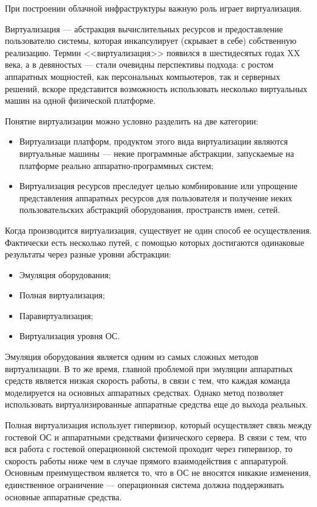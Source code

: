 При построении облачной инфраструктуры важную роль играет виртуализация.

Виртуализация --- абстракция вычислительных ресурсов и предоставление пользователю системы, которая инкапсулирует (скрывает в себе) собственную реализацию.
Термин <<виртуализация>> появился в шестидесятых годах XX века, а в девяностых --- стали очевидны перспективы подхода: с ростом аппаратных мощностей, как персональных компьютеров, так и серверных решений, вскоре представится возможность использовать несколько виртуальных машин на одной физической платформе.

Понятие виртуализации можно условно разделить на две категории:
\begin{itemize}
  \item Виртуализаци платформ, продуктом этого вида виртуализации являются виртуальные машины --- некие программные абстракции, запускаемые на платформе реально аппаратно-программных систем;
  \item Виртуализация ресурсов преследует целью комбнирование или упрощение представления аппаратных ресурсов для пользователя и получение неких пользовательских абстракций оборудования, пространств имен, сетей.
\end{itemize}

Когда производится виртуализация, существует не один способ ее осуществления.
Фактически есть несколько путей, с помощью которых достигаются одинаковые результаты через разные уровни абстракции:
\begin{itemize}
  \item Эмуляция оборудования;
  \item Полная виртуализация;
  \item Паравиртуализация;
  \item Виртуализация уровня ОС.
\end{itemize}

Эмуляция оборудования является одним из самых сложных методов виртуализации.
В то же время, главной проблемой при эмуляции аппаратных средств является низкая скорость работы, в связи с тем, что каждая команда моделируется на основных аппаратных средствах. 
Однако метод позволяет использовать виртуализированные аппаратные средства еще до выхода реальных.

Полная виртуализация использует гипервизор, который осуществляет связь между гостевой ОС и аппаратными средствами физического сервера.
В связи с тем, что вся работа с гостевой операционной системой проходит через гипервизор, то скорость работы ниже чем в случае прямого взаимодействия с аппаратурой.
Основным преимуществом является то, что в ОС не вносятся никакие изменения, единственное ограничение --- операционная система должна поддерживать основные аппаратные средства.

